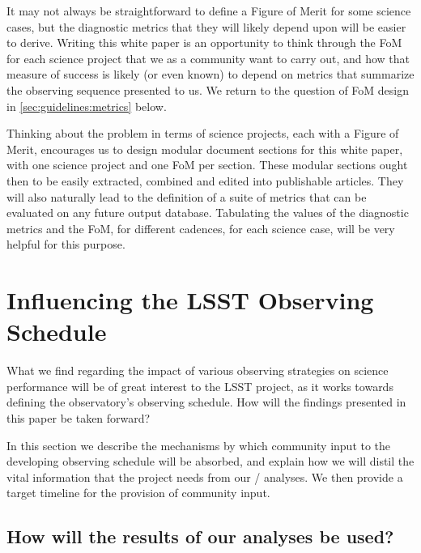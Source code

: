It may not always be straightforward to define a Figure of
Merit for some science cases, but the diagnostic metrics that they will likely depend
upon will be easier to derive. Writing this white paper is an
opportunity to think through the FoM for each science
project that we as a community want to carry out, and how that measure
of success is likely (or even known) to depend on metrics that
summarize the observing sequence presented to us. We return to the
question of FoM design in \autoref{sec:guidelines:metrics} below.

Thinking about the problem in terms of science projects, each with a
Figure of Merit, encourages us to design modular document sections
for this white paper, with
one science project and one FoM per section. These modular
sections ought then to be easily extracted, combined and edited into
publishable articles. They will also naturally lead to the definition of
a suite of \MAF metrics that can be evaluated on any future \OpSim output
database.  Tabulating the values of the diagnostic metrics and the FoM,
for different cadences, for each science case, will be very helpful for
this purpose.


\section{Influencing the LSST Observing Schedule}
\label{sec:\secname:schedule}

What we find regarding the impact of various observing strategies on
science performance will be of great interest to the LSST project, as it
works towards defining the observatory's observing schedule. How will
the findings presented in this paper be taken forward?

In this section we describe the mechanisms by which community input to
the developing observing schedule will be absorbed, and explain how
we will distil the vital information that the project needs from our
\OpSim / \MAF analyses. We then provide a target timeline for the provision of community input.


\subsection{How will the results of our analyses be used?}
\label{sec:\secname:useage}

